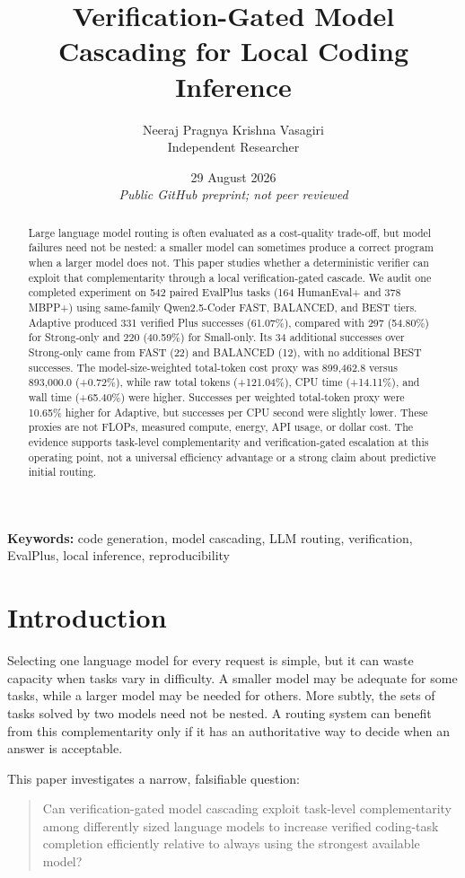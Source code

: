 \documentclass[10pt]{article}
\title{\textbf{Verification-Gated Model Cascading for Local Coding Inference}}
\author{Neeraj Pragnya Krishna Vasagiri\\Independent Researcher}
\date{29 August 2026\\\textit{Public GitHub preprint; not peer reviewed}}
\begin{document}
\maketitle

\begin{abstract}
Large language model routing is often evaluated as a cost-quality trade-off,
but model failures need not be nested: a smaller model can sometimes produce
a correct program when a larger model does not. This paper studies whether a
deterministic verifier can exploit that complementarity through a local
verification-gated cascade. We audit one completed experiment on 542 paired
EvalPlus tasks (164 HumanEval+ and 378 MBPP+) using same-family Qwen2.5-Coder
FAST, BALANCED, and BEST tiers. Adaptive produced 331 verified Plus successes
(61.07\%), compared with 297 (54.80\%) for Strong-only and 220 (40.59\%) for
Small-only. Its 34 additional successes over Strong-only came from FAST (22)
and BALANCED (12), with no additional BEST successes. The model-size-weighted
total-token cost proxy was 899,462.8 versus 893,000.0 (+0.72\%), while raw
total tokens (+121.04\%), CPU time (+14.11\%), and wall time (+65.40\%) were
higher. Successes per weighted total-token proxy were 10.65\% higher for
Adaptive, but successes per CPU second were slightly lower. These proxies are
not FLOPs, measured compute, energy, API usage, or dollar cost. The evidence
supports task-level complementarity and verification-gated escalation at this
operating point, not a universal efficiency advantage or a strong claim about
predictive initial routing.
\end{abstract}

\textbf{Keywords:} code generation, model cascading, LLM routing, verification,
EvalPlus, local inference, reproducibility

\section{Introduction}

Selecting one language model for every request is simple, but it can waste
capacity when tasks vary in difficulty. A smaller model may be adequate for
some tasks, while a larger model may be needed for others. More subtly, the
sets of tasks solved by two models need not be nested. A routing system can
benefit from this complementarity only if it has an authoritative way to decide
when an answer is acceptable.

This paper investigates a narrow, falsifiable question:
\begin{quote}
Can verification-gated model cascading exploit task-level complementarity among
differently sized language models to increase verified coding-task completion
efficiently relative to always using the strongest available model?
\end{quote}
\end{document}

